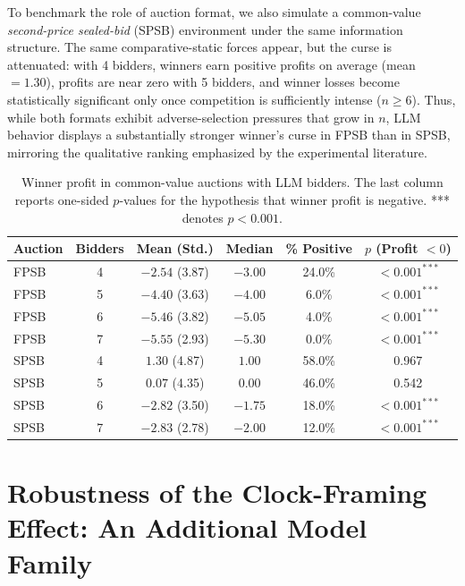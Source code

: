 \documentclass{article} %
\newif\ifmarkrev
\newcommand{\rev}[1]{\ifmarkrev\begingroup\color{red}#1\endgroup\else#1\fi}
\begin{document}
To benchmark the role of auction format, we also simulate a common-value \emph{second-price sealed-bid} (SPSB) environment under the same information structure. The same comparative-static forces appear, but the curse is attenuated: with 4 bidders, winners earn positive profits on average (mean $=1.30$), profits are near zero with 5 bidders, and winner losses become statistically significant only once competition is sufficiently intense ($n\ge 6$). Thus, while both formats exhibit adverse-selection pressures that grow in $n$, LLM behavior displays a substantially stronger winner’s curse in FPSB than in SPSB, mirroring the qualitative ranking emphasized by the experimental literature\citep{levin1996revenue}.

\begin{table}[H]
\centering
\begin{tabular}{lccccc}
\toprule
\textbf{Auction} & \textbf{Bidders} & \textbf{Mean (Std.)} & \textbf{Median} & \textbf{\% Positive} & \textbf{$p$ (Profit $<0$)} \\
\midrule
FPSB & 4 & $-2.54$ (3.87) & $-3.00$ & 24.0\% & $<0.001^{***}$ \\
FPSB & 5 & $-4.40$ (3.63) & $-4.00$ & 6.0\%  & $<0.001^{***}$ \\
FPSB & 6 & $-5.46$ (3.82) & $-5.05$ & 4.0\%  & $<0.001^{***}$ \\
FPSB & 7 & $-5.55$ (2.93) & $-5.30$ & 0.0\%  & $<0.001^{***}$ \\
\midrule
SPSB & 4 & $1.30$ (4.87)  & $1.00$  & 58.0\% & 0.967 \\
SPSB & 5 & $0.07$ (4.35)  & $0.00$  & 46.0\% & 0.542 \\
SPSB & 6 & $-2.82$ (3.50) & $-1.75$ & 18.0\% & $<0.001^{***}$ \\
SPSB & 7 & $-2.83$ (2.78) & $-2.00$ & 12.0\% & $<0.001^{***}$ \\
\bottomrule
\end{tabular}
\caption{Winner profit in common-value auctions with LLM bidders. The last column reports one-sided $p$-values for the hypothesis that winner profit is negative. *** denotes $p < 0.001$.}
\label{tab:winner_curse_llm}
\end{table}

\section{\texorpdfstring{\rev{Robustness of the Clock-Framing Effect: An Additional Model Family}}{Robustness of the Clock-Framing Effect: An Additional Model Family}}\label{app:clock_robustness}
\end{document}
